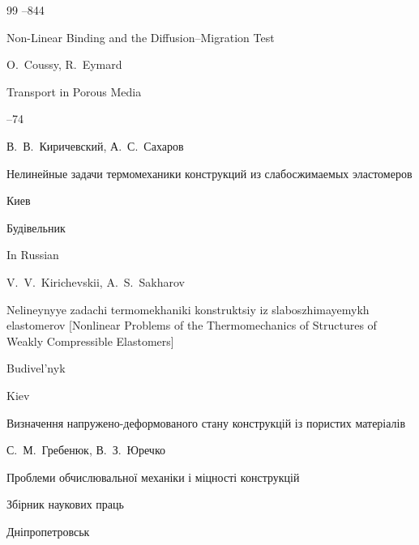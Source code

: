 \begin{thebibliography}{99}
--844





\paper Non-Linear Binding and the Diffusion–Migration Test

\by O.~Coussy, R.~Eymard

\jour Transport in Porous Media




--74


    




\by В.~В.~Киричевский, А.~С.~Сахаров

\book Нелинейные задачи термомеханики конструкций из слабосжимаемых эластомеров

\publaddr Киев

\publ Будівельник



\misctransl

\lang In Russian

\by V.~V.~Kirichevskii, A.~S.~Sakharov

\book Nelineynyye zadachi termomekhaniki konstruktsiy iz slaboszhimayemykh elastomerov \rm [Nonlinear Problems of the Thermomechanics of Structures of Weakly Compressible Elastomers]

\publ Budivel'nyk

\publaddr Kiev 








\paper Визначення напружено-деформованого стану конструкцій із пористих матеріалів

\by  С.~М.~Гребенюк, В.~З.~Юречко

\inbook Проблеми обчислювальної механіки і міцності конструкцій

\bookinfo Збірник наукових праць

\publaddr Дніпропетровськ


\end{thebibliography}
